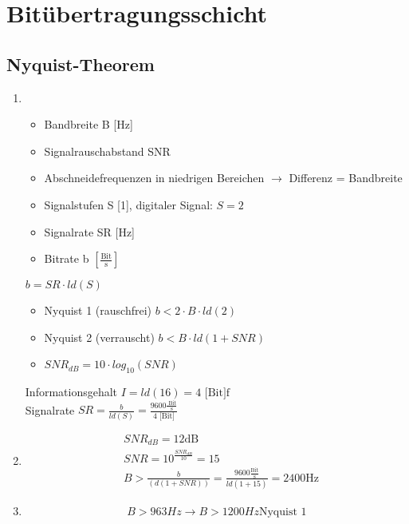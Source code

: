 \section{Bitübertragungsschicht}
\subsection{Nyquist-Theorem}
\begin{enumerate}
	\item 
	\begin{itemize}
		\item Bandbreite B [Hz]
		\item Signalrauschabstand SNR
		\item Abschneidefrequenzen in niedrigen Bereichen \(\to\) Differenz = Bandbreite
		\item Signalstufen S [1], digitaler Signal: \(S = 2\)
		\item Signalrate SR [Hz]
		\item Bitrate b \([\frac{\text{Bit}}{\text{s}}]\)
	\end{itemize}
	\(b = SR \cdot ld(S)\)
	\begin{itemize}
		\item Nyquist 1 (rauschfrei) \(b < 2\cdot B\cdot ld(2)\)
		\item Nyquist 2 (verrauscht) \(b < B \cdot ld(1+SNR) \)
		\item \(SNR_{dB} = 10 \cdot log_{10}(SNR)\)
	\end{itemize}
	Informationsgehalt \(I = ld(16) = 4 \text{ [Bit]f}\)\\
	Signalrate \(SR = \frac{b}{ld(S)} = \frac{9600 \frac{\text{ Bit}}{\text{s}}}{4 \text{ [Bit]}} \)
	\item
	\begin{align*}
	&SNR_{dB} = 12 \text{dB} \\ &SNR = 10^{\frac{SNR_{dB}}{10}} = 15 \\ &B > \frac{b}{(d(1+SNR))} = \frac{9600\frac{\text{Bit}}{\text{s}}}{ld(1+15)} = 2400 \text{Hz}
	\end{align*}
	\item 
	\begin{displaymath}
		B > 963 Hz \to B > 1200 Hz \text{Nyquist 1}
	\end{displaymath}
\end{enumerate}
